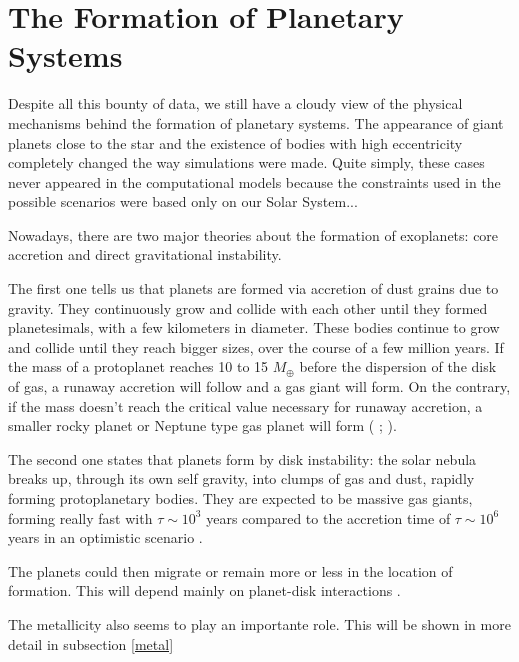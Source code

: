 \documentclass[dvips,12pt,a4paper]{report}
\begin{document}
\section {The Formation of Planetary Systems}
\label {planets}
\indent Despite all this bounty of data, we still have a cloudy view of the physical mechanisms behind the formation of planetary systems. The appearance of giant planets close to the star and the existence of bodies with high eccentricity completely changed the way simulations were made. Quite simply, these cases never appeared in the computational models because the constraints used in the possible scenarios were based only on our Solar System...

Nowadays, there are two major theories about the formation of exoplanets: core accretion and direct gravitational instability. 

The first one tells us that planets are formed via accretion of dust grains due to gravity. They continuously grow and collide with each other until they formed planetesimals, with a few kilometers in diameter. These bodies continue to grow and collide until they reach bigger sizes, over the course of a few million years. If the mass of a protoplanet reaches 10 to 15 $M_{\oplus}$ before the dispersion of the disk of gas, a runaway accretion will follow and a gas giant will form. On the contrary, if the mass doesn't reach the critical value necessary for runaway accretion, a smaller rocky planet or Neptune type gas planet will form (\citeauthor{Pollack-1996} \citeyear{Pollack-1996}; \citeauthor{Alibert-2006} \citeyear{Alibert-2006}). 

The second one states that planets form by disk instability: the solar nebula breaks up, through its own self gravity, into clumps of gas and dust, rapidly forming protoplanetary bodies. They are expected to be massive gas giants, forming really fast with  $\tau\sim10^3$ years compared to the accretion time of $\tau\sim10^6$ years in an optimistic scenario \citep{Boss-1997}. 

The planets could then migrate or remain more or less in the location of formation. This will depend mainly on planet-disk interactions \citep{Trilling-1998}.

The metallicity also seems to play an importante role. This will be shown in more detail in subsection \ref{metal}

\end{document}
